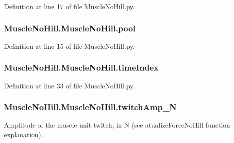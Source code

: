 Definition at line 17 of file Muscle\+No\+Hill.\+py.

\subsubsection[{\texorpdfstring{pool}{pool}}]{\setlength{\rightskip}{0pt plus 5cm}Muscle\+No\+Hill.\+Muscle\+No\+Hill.\+pool}\hypertarget{class_muscle_no_hill_1_1_muscle_no_hill_a93bd043a0b802af9268873b1d2a4cc57}{}\label{class_muscle_no_hill_1_1_muscle_no_hill_a93bd043a0b802af9268873b1d2a4cc57}


Definition at line 15 of file Muscle\+No\+Hill.\+py.

\subsubsection[{\texorpdfstring{time\+Index}{timeIndex}}]{\setlength{\rightskip}{0pt plus 5cm}Muscle\+No\+Hill.\+Muscle\+No\+Hill.\+time\+Index}\hypertarget{class_muscle_no_hill_1_1_muscle_no_hill_a8dc677d638584602a8de38305dd631ef}{}\label{class_muscle_no_hill_1_1_muscle_no_hill_a8dc677d638584602a8de38305dd631ef}


Definition at line 33 of file Muscle\+No\+Hill.\+py.

\subsubsection[{\texorpdfstring{twitch\+Amp\+\_\+N}{twitchAmp_N}}]{\setlength{\rightskip}{0pt plus 5cm}Muscle\+No\+Hill.\+Muscle\+No\+Hill.\+twitch\+Amp\+\_\+N}\hypertarget{class_muscle_no_hill_1_1_muscle_no_hill_aeb5782fa0602e372c6fa6d42abdd9ee6}{}\label{class_muscle_no_hill_1_1_muscle_no_hill_aeb5782fa0602e372c6fa6d42abdd9ee6}


Amplitude of the muscle unit twitch, in N (see atualize\+Force\+No\+Hill function explanation). 



